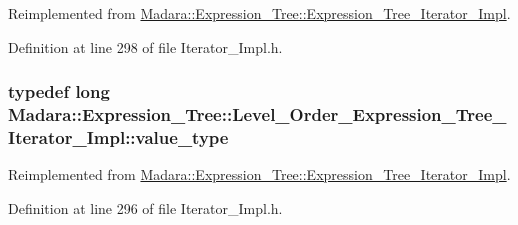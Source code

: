 Reimplemented from \hyperlink{classMadara_1_1Expression__Tree_1_1Expression__Tree__Iterator__Impl_adbfbf382a07c981d136ea739c913aeab}{Madara::Expression\_\-Tree::Expression\_\-Tree\_\-Iterator\_\-Impl}.



Definition at line 298 of file Iterator\_\-Impl.h.

\hypertarget{classMadara_1_1Expression__Tree_1_1Level__Order__Expression__Tree__Iterator__Impl_a8c7971c6809cb6ed6070d38da663bb45}{
\subsubsection[{value\_\-type}]{\setlength{\rightskip}{0pt plus 5cm}typedef long {\bf Madara::Expression\_\-Tree::Level\_\-Order\_\-Expression\_\-Tree\_\-Iterator\_\-Impl::value\_\-type}}}
\label{dc/de7/classMadara_1_1Expression__Tree_1_1Level__Order__Expression__Tree__Iterator__Impl_a8c7971c6809cb6ed6070d38da663bb45}


Reimplemented from \hyperlink{classMadara_1_1Expression__Tree_1_1Expression__Tree__Iterator__Impl_a7905c3a8d6cb961d826aff8bbd10e520}{Madara::Expression\_\-Tree::Expression\_\-Tree\_\-Iterator\_\-Impl}.



Definition at line 296 of file Iterator\_\-Impl.h.



